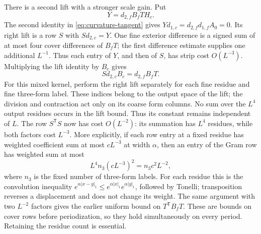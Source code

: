 There is a second lift with a stronger scale gain. Put
\[
                         Y=d_{2,f}B_fTH_c.
\]
The second identity in \eqref{eq:curvature-tangent} gives
$Yd_{1,c}=d_{2,f}d_{1,f}A_0=0$. Its right lift is a row $S$
with $Sd_{2,c}=Y$. One fine exterior difference is a signed
sum of at most four cover differences of $B_fT$; the first
difference estimate supplies one additional $L^{-1}$.
Thus each entry of $Y$, and then of $S$, has strip cost
$O(L^{-3})$. Multiplying the lift identity by $B_c$ gives
\begin{equation}\label{eq:curvature-charge-lift}
                     S d_{2,c}B_c=d_{2,f}B_fT.
\end{equation}
For this mixed kernel, perform the right lift separately for each fine
residue and fine three-form label. These indices belong to the output
space of the lift; the division and contraction act only on its coarse
form columns. No sum over the $L^4$ output residues occurs in the lift
bound. Thus its constant remains independent of $L$.
The row $S^{\mathsf T}S$ now has cost $O(L^{-2})$:
its summation has $L^4$ residues, while both factors cost
$L^{-3}$. More explicitly, if each row entry at a fixed residue has
weighted coefficient sum at most $cL^{-3}$ at width $\alpha$, then
an entry of the Gram row has weighted sum at most
\[
 L^4 n_3(cL^{-3})^2=n_3c^2L^{-2},
\]
where $n_3$ is the fixed number of three-form labels. For each residue
this is the convolution inequality
$e^{\alpha|x-y|_1}\le e^{\alpha|x|_1}e^{\alpha|y|_1}$,
followed by Tonelli; transposition reverses a displacement and does not
change its weight. The same argument with two $L^{-2}$ factors gives
the earlier uniform bound on $T^{\mathsf T}B_fT$. These are bounds on
cover rows before periodization, so they hold simultaneously on every
period. Retaining the residue count is essential.

